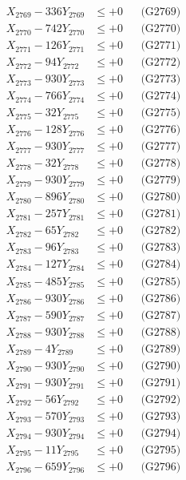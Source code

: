 \documentclass[a4paper,10pt]{article}
\begin{document}
{\begin{align}
X_{2769} - 336Y_{2769} &\leq +0 && \text{(G2769)} \\
X_{2770} - 742Y_{2770} &\leq +0 && \text{(G2770)} \\
\allowbreak
X_{2771} - 126Y_{2771} &\leq +0 && \text{(G2771)} \\
X_{2772} - 94Y_{2772} &\leq +0 && \text{(G2772)} \\
X_{2773} - 930Y_{2773} &\leq +0 && \text{(G2773)} \\
X_{2774} - 766Y_{2774} &\leq +0 && \text{(G2774)} \\
X_{2775} - 32Y_{2775} &\leq +0 && \text{(G2775)} \\
X_{2776} - 128Y_{2776} &\leq +0 && \text{(G2776)} \\
X_{2777} - 930Y_{2777} &\leq +0 && \text{(G2777)} \\
X_{2778} - 32Y_{2778} &\leq +0 && \text{(G2778)} \\
X_{2779} - 930Y_{2779} &\leq +0 && \text{(G2779)} \\
X_{2780} - 896Y_{2780} &\leq +0 && \text{(G2780)} \\
\allowbreak
X_{2781} - 257Y_{2781} &\leq +0 && \text{(G2781)} \\
X_{2782} - 65Y_{2782} &\leq +0 && \text{(G2782)} \\
X_{2783} - 96Y_{2783} &\leq +0 && \text{(G2783)} \\
X_{2784} - 127Y_{2784} &\leq +0 && \text{(G2784)} \\
X_{2785} - 485Y_{2785} &\leq +0 && \text{(G2785)} \\
X_{2786} - 930Y_{2786} &\leq +0 && \text{(G2786)} \\
X_{2787} - 590Y_{2787} &\leq +0 && \text{(G2787)} \\
X_{2788} - 930Y_{2788} &\leq +0 && \text{(G2788)} \\
X_{2789} - 4Y_{2789} &\leq +0 && \text{(G2789)} \\
X_{2790} - 930Y_{2790} &\leq +0 && \text{(G2790)} \\
\allowbreak
X_{2791} - 930Y_{2791} &\leq +0 && \text{(G2791)} \\
X_{2792} - 56Y_{2792} &\leq +0 && \text{(G2792)} \\
X_{2793} - 570Y_{2793} &\leq +0 && \text{(G2793)} \\
X_{2794} - 930Y_{2794} &\leq +0 && \text{(G2794)} \\
X_{2795} - 11Y_{2795} &\leq +0 && \text{(G2795)} \\
X_{2796} - 659Y_{2796} &\leq +0 && \text{(G2796)} \\

\end{align}}
\end{document}
